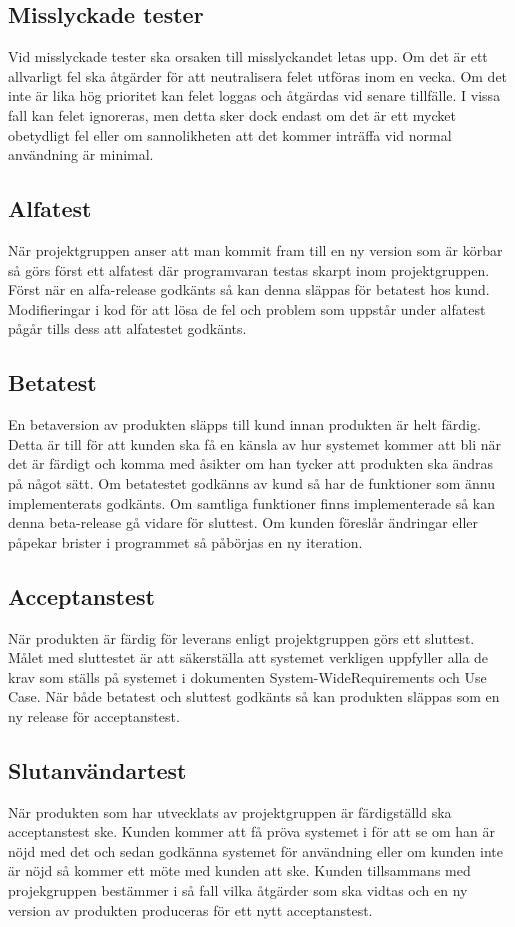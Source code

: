 \subsection{Misslyckade tester}
Vid misslyckade tester ska orsaken till misslyckandet letas upp. Om det är ett allvarligt fel ska åtgärder för att neutralisera felet utföras inom en vecka. Om det inte är lika hög prioritet kan felet loggas och åtgärdas vid senare tillfälle. I vissa fall kan felet ignoreras, men detta sker dock endast om det är ett mycket obetydligt fel eller om sannolikheten att det kommer inträffa vid normal användning är minimal.

\subsection{Alfatest}
När projektgruppen anser att man kommit fram till en ny version som är körbar så görs först ett alfatest där programvaran testas skarpt inom projektgruppen. Först när en alfa-release godkänts så kan denna släppas för betatest hos kund. Modifieringar i kod för att lösa de fel och problem som uppstår under alfatest pågår tills dess att alfatestet godkänts.

\subsection{Betatest}
En betaversion av produkten släpps till kund innan produkten är helt färdig. Detta är till för att kunden ska få en känsla av hur systemet kommer att bli när det är färdigt och komma med åsikter om han tycker att produkten ska ändras på något sätt. Om betatestet godkänns av kund så har de funktioner som ännu implementerats godkänts. Om samtliga funktioner finns implementerade så kan denna beta-release gå vidare för sluttest. Om kunden föreslår ändringar eller påpekar brister i programmet så påbörjas en ny iteration.

\subsection{Acceptanstest}
När produkten är färdig för leverans enligt projektgruppen görs ett sluttest. Målet med sluttestet är att säkerställa att systemet verkligen uppfyller alla de krav som ställs på systemet i dokumenten System-WideRequirements och Use Case. När både betatest och sluttest godkänts så kan produkten släppas som en ny release för acceptanstest.

\subsection{Slutanvändartest}
När produkten som har utvecklats av projektgruppen är färdigställd ska acceptanstest ske. Kunden kommer att få pröva systemet i för att se om han är nöjd med det och sedan godkänna systemet för användning eller om kunden inte är nöjd så kommer ett möte med kunden att ske. Kunden tillsammans med projekgruppen bestämmer i så fall vilka åtgärder som ska vidtas och en ny version av produkten produceras för ett nytt acceptanstest.

